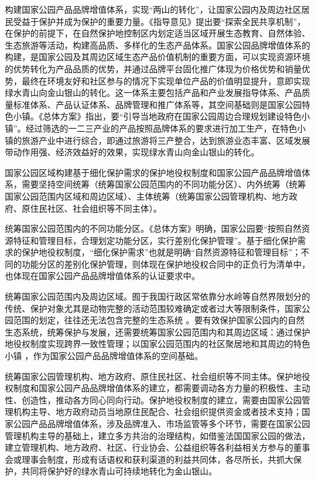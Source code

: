 \documentclass[]{book}
\begin{document}
构建国家公园产品品牌增值体系，实现``两山的转化''，让国家公园内及周边社区居民受益于保护并成为保护的重要力量。《指导意见》提出要``探索全民共享机制''，在保护的前提下，在自然保护地控制区内划定适当区域开展生态教育、自然体验、生态旅游等活动，构建高品质、多样化的生态产品体系。国家公园品牌增值体系的构建，是国家公园及其周边区域生态产品价值机制的重要方面，可以实现资源环境的优势转化为产品品质的优势，并通过品牌平台固化推广体现为价格优势和销量优势，最终在环境友好和社区参与的情况下实现单位产品的价值明显提升，意即实现绿水青山向金山银山的转化。这一体系主要包括产品和产业发展指导体系、产品质量标准体系、产品认证体系、品牌管理和推广体系等，其空间基础则是国家公园特色小镇。《总体方案》指出，要``引导当地政府在国家公园周边合理规划建设特色小镇''。经过筛选的一二三产业的产品按照品牌体系的要求进行加工生产，在特色小镇的旅游产业中进行综合，即通过旅游将三产整合，达到旅游业态丰富、区域发展带动作用强、经济效益好的效果，实现绿水青山向金山银山的转化。

国家公园区域构建基于细化保护需求的保护地役权制度和国家公园产品品牌增值体系，需要坚持空间统筹（统筹国家公园范围内的不同功能分区）、内外统筹（统筹国家公园范围内区域和周边区域）、主体统筹（统筹国家公园管理机构、地方政府、原住民社区、社会组织等不同主体）。

统筹国家公园范围内的不同功能分区。《总体方案》明确，国家公园要``按照自然资源特征和管理目标，合理划定功能分区，实行差别化保护管理''。基于细化保护需求的保护地役权制度，``细化保护需求''也就是明确``自然资源特征和管理目标''；不同的功能分区的差别化保护管理，则体现在保护地役权合同中的正负行为清单中，也体现在国家公园产品品牌增值体系的认证要求中。

统筹国家公园范围内及周边区域。囿于我国行政区常依靠分水岭等自然界限划分的传统、保护对象尤其是动物完整的活动范围较难确定或者过大等限制条件，国家公园范围的划定，往往还无法包含完整的生态系统 。要有效保护国家公园内的自然生态系统，统筹保护与发展，还需要统筹国家公园范围内和其周边区域：通过保护地役权制度实现跨界一致性管理；以国家公园范围内的社区聚居地和其周边的特色小镇 ，作为国家公园产品品牌增值体系的空间基础。

统筹国家公园管理机构、地方政府、原住民社区、社会组织等不同主体。保护地役权制度和国家公园产品品牌增值体系的建立，都需要调动各方力量的积极性、主动性、创造性，推动各方同心同向行动。保护地役权制度的建立，需要由国家公园管理机构主导、地方政府动员当地原住民配合、社会组织提供资金或者技术支持；国家公园产品品牌增值体系，涉及品牌准入、市场监管等多个环节，需要在国家公园管理机构主导的基础上，建立多方共治的治理结构，如借鉴法国国家公园的做法，建立管理机构、地方政府、社区、行业协会、公益组织等各利益相关方参与的董事会或理事会制度，形成有话语权和获利渠道的利益共同体，各尽所长，共抓大保护，共同将保护好的绿水青山可持续地转化为金山银山。
\end{document}
